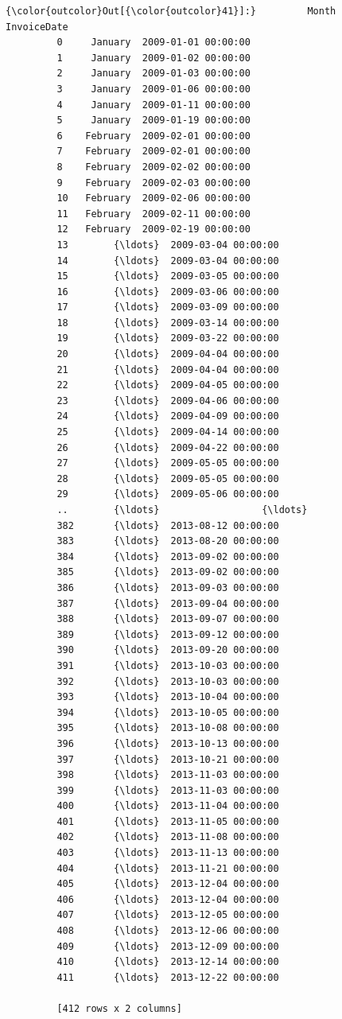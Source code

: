 \documentclass[11pt]{article}
\begin{document}
\begin{Verbatim}[commandchars=\\\{\}]
{\color{outcolor}Out[{\color{outcolor}41}]:}         Month          InvoiceDate
         0     January  2009-01-01 00:00:00
         1     January  2009-01-02 00:00:00
         2     January  2009-01-03 00:00:00
         3     January  2009-01-06 00:00:00
         4     January  2009-01-11 00:00:00
         5     January  2009-01-19 00:00:00
         6    February  2009-02-01 00:00:00
         7    February  2009-02-01 00:00:00
         8    February  2009-02-02 00:00:00
         9    February  2009-02-03 00:00:00
         10   February  2009-02-06 00:00:00
         11   February  2009-02-11 00:00:00
         12   February  2009-02-19 00:00:00
         13        {\ldots}  2009-03-04 00:00:00
         14        {\ldots}  2009-03-04 00:00:00
         15        {\ldots}  2009-03-05 00:00:00
         16        {\ldots}  2009-03-06 00:00:00
         17        {\ldots}  2009-03-09 00:00:00
         18        {\ldots}  2009-03-14 00:00:00
         19        {\ldots}  2009-03-22 00:00:00
         20        {\ldots}  2009-04-04 00:00:00
         21        {\ldots}  2009-04-04 00:00:00
         22        {\ldots}  2009-04-05 00:00:00
         23        {\ldots}  2009-04-06 00:00:00
         24        {\ldots}  2009-04-09 00:00:00
         25        {\ldots}  2009-04-14 00:00:00
         26        {\ldots}  2009-04-22 00:00:00
         27        {\ldots}  2009-05-05 00:00:00
         28        {\ldots}  2009-05-05 00:00:00
         29        {\ldots}  2009-05-06 00:00:00
         ..        {\ldots}                  {\ldots}
         382       {\ldots}  2013-08-12 00:00:00
         383       {\ldots}  2013-08-20 00:00:00
         384       {\ldots}  2013-09-02 00:00:00
         385       {\ldots}  2013-09-02 00:00:00
         386       {\ldots}  2013-09-03 00:00:00
         387       {\ldots}  2013-09-04 00:00:00
         388       {\ldots}  2013-09-07 00:00:00
         389       {\ldots}  2013-09-12 00:00:00
         390       {\ldots}  2013-09-20 00:00:00
         391       {\ldots}  2013-10-03 00:00:00
         392       {\ldots}  2013-10-03 00:00:00
         393       {\ldots}  2013-10-04 00:00:00
         394       {\ldots}  2013-10-05 00:00:00
         395       {\ldots}  2013-10-08 00:00:00
         396       {\ldots}  2013-10-13 00:00:00
         397       {\ldots}  2013-10-21 00:00:00
         398       {\ldots}  2013-11-03 00:00:00
         399       {\ldots}  2013-11-03 00:00:00
         400       {\ldots}  2013-11-04 00:00:00
         401       {\ldots}  2013-11-05 00:00:00
         402       {\ldots}  2013-11-08 00:00:00
         403       {\ldots}  2013-11-13 00:00:00
         404       {\ldots}  2013-11-21 00:00:00
         405       {\ldots}  2013-12-04 00:00:00
         406       {\ldots}  2013-12-04 00:00:00
         407       {\ldots}  2013-12-05 00:00:00
         408       {\ldots}  2013-12-06 00:00:00
         409       {\ldots}  2013-12-09 00:00:00
         410       {\ldots}  2013-12-14 00:00:00
         411       {\ldots}  2013-12-22 00:00:00
         
         [412 rows x 2 columns]
\end{Verbatim}
            
\end{document}
